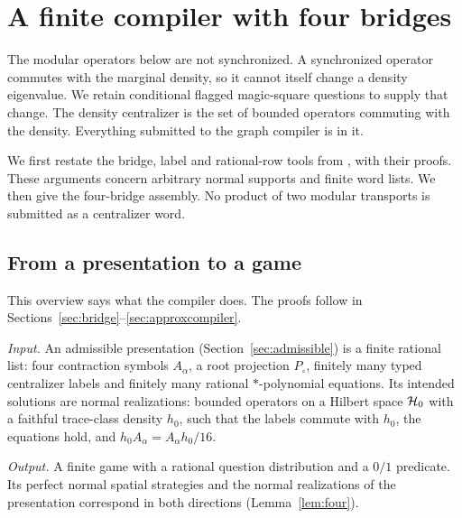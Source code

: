 \section{A finite compiler with four bridges}\label{sec:compiler}
The modular operators below are not synchronized. A synchronized operator commutes with the marginal density, so it cannot itself change a density eigenvalue. We retain conditional flagged magic-square questions to supply that change. The density centralizer is the set of bounded operators commuting with the density. Everything submitted to the graph compiler is in it.

We first restate the bridge, label and rational-row tools from \cite[Lemmas~4.1 and 4.2, Theorem~B, Eq.~(32)]{Entropy}, with their proofs. These arguments concern arbitrary normal supports and finite word lists. We then give the four-bridge assembly. No product of two modular transports is submitted as a centralizer word.
\subsection*{From a presentation to a game}
This overview says what the compiler does. The proofs follow in Sections~\ref{sec:bridge}--\ref{sec:approxcompiler}.

\emph{Input.} An admissible presentation (Section~\ref{sec:admissible}) is a finite rational list: four contraction symbols $A_\alpha$, a root projection $P_\circ$, finitely many typed centralizer labels and finitely many rational $*$-polynomial equations. Its intended solutions are normal realizations: bounded operators on a Hilbert space $\mathcal H_0$ with a faithful trace-class density $h_0$, such that the labels commute with $h_0$, the equations hold, and $h_0A_\alpha=A_\alpha h_0/16$.

\emph{Output.} A finite game with a rational question distribution and a $0/1$ predicate. Its perfect normal spatial strategies and the normal realizations of the presentation correspond in both directions (Lemma~\ref{lem:four}).

